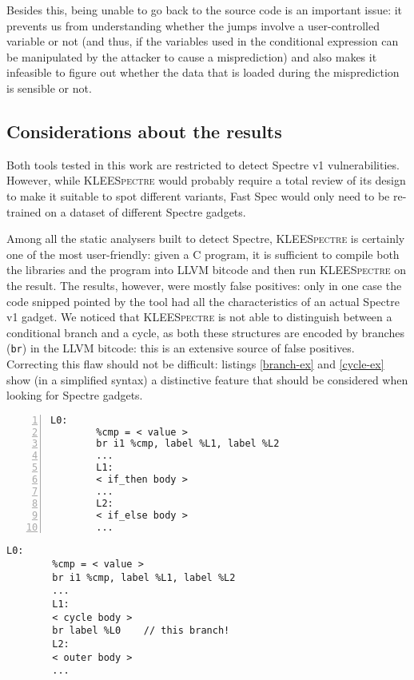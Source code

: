 \documentclass[target=mst,aauheader=aics]{thud}
\theoremstyle{definition}
\begin{document}
Besides this, being unable to go back to the source code is an important issue: it prevents us from understanding whether the jumps involve a user-controlled variable or not (and thus, if the variables used in the conditional expression can be manipulated by the attacker to cause a misprediction) and also makes it infeasible to figure out whether the data that is loaded during the misprediction is sensible or not. 
\subsection{Considerations about the results}\label{sec:final}
Both tools tested in this work are restricted to detect Spectre v1 vulnerabilities. However, while \textsc{KLEESpectre} would probably require a total review of its design to make it suitable to spot different variants, Fast Spec would only need to be re-trained on a dataset of different Spectre gadgets. 

Among all the static analysers built to detect Spectre, \textsc{KLEESpectre} is certainly one of the most user-friendly: given a C program, it is sufficient to compile both the libraries and the program into LLVM bitcode and then run \textsc{KLEESpectre} on the result. The results, however, were mostly false positives: only in one case the code snipped pointed by the tool had all the characteristics of an actual Spectre v1 gadget. We noticed that \textsc{KLEESpectre} is not able to distinguish between a conditional branch and a cycle, as both these structures are encoded by branches (\texttt{br}) in the LLVM bitcode: this is an extensive source of false positives. Correcting this flaw should not be difficult: listings \ref{branch-ex} and \ref{cycle-ex} show (in a simplified syntax) a distinctive feature that should be considered when looking for Spectre gadgets.

\begin{minipage}{0.45\textwidth}
	\begin{lstlisting}[basicstyle=\scriptsize\ttfamily, caption={\small LLVM bitcode fragment a conditional branch\vspace{2mm}}, label=branch-ex, numbers=left]
		L0:	
		%cmp = < value >
		br i1 %cmp, label %L1, label %L2
		...
		L1:
		< if_then body >
		...
		L2:
		< if_else body >
		...
	\end{lstlisting}
\end{minipage}\hfill
\begin{minipage}{0.45\textwidth}
	\begin{lstlisting}[basicstyle=\scriptsize\ttfamily, caption={\small LLVM bitcode fragment encoding a cycle\vspace{2mm}}, numbers=right, label=cycle-ex]
		L0:
		%cmp = < value >
		br i1 %cmp, label %L1, label %L2
		...
		L1:
		< cycle body >
		br label %L0	// this branch!
		L2:
		< outer body >
		...
	\end{lstlisting}
\end{minipage}
\vspace{3mm}
\end{document}
